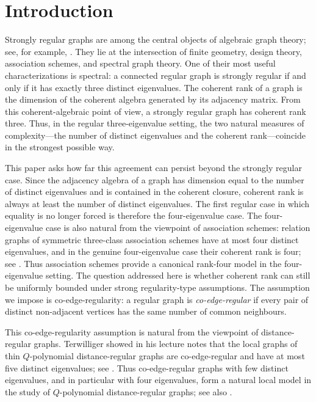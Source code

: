 \documentclass[reqno,a4paper,11pt]{article}
\theoremstyle{definition}
\theoremstyle{remark}
\begin{document}
\section{Introduction}

Strongly regular graphs are among the central objects of algebraic graph theory; see, for example, \cite{BrVM2022}.  They lie at the intersection of finite geometry, design theory, association schemes, and spectral graph theory.  One of their most useful characterizations is spectral: a connected regular graph is strongly regular if and only if it has exactly three distinct eigenvalues. 
The coherent rank of a graph is the dimension of the coherent algebra generated by its adjacency matrix.
  From this coherent-algebraic point of view, 
  a strongly regular graph has coherent rank three.
 Thus, in the regular three-eigenvalue setting, the two natural measures of complexity---the number of distinct eigenvalues and the coherent rank---coincide in the strongest possible way.


This paper asks how far this agreement can persist beyond the strongly regular case. 
Since the adjacency algebra of a graph has dimension equal to the number of distinct eigenvalues and is contained in the coherent closure, coherent rank is always at least the number of distinct eigenvalues. 
The first regular case in which equality is no longer forced is therefore the four-eigenvalue case. 
The four-eigenvalue case is also natural from the viewpoint of association schemes: relation graphs of symmetric three-class association schemes have at most four distinct eigenvalues, and in the genuine four-eigenvalue case their coherent rank is four; see \cite{van99,vs98}. 
Thus association schemes provide a canonical rank-four model in the four-eigenvalue setting.
The question addressed here is whether coherent rank can still be uniformly bounded under strong regularity-type assumptions.
The assumption we impose is co-edge-regularity:  a regular graph is \emph{co-edge-regular} if every pair of distinct non-adjacent vertices has the same number of common neighbours.




  
  
 This co-edge-regularity assumption is natural from the viewpoint of distance-regular graphs. 
 Terwilliger showed in his lecture notes that the local graphs of thin \(Q\)-polynomial distance-regular graphs are co-edge-regular and have at most five distinct eigenvalues; see \cite{Ternotes}. 
 Thus co-edge-regular graphs with few distinct eigenvalues, and in particular with four eigenvalues, form a natural local model in the study of \(Q\)-polynomial distance-regular graphs; see also \cite{GCK2021}.
 
\end{document}
